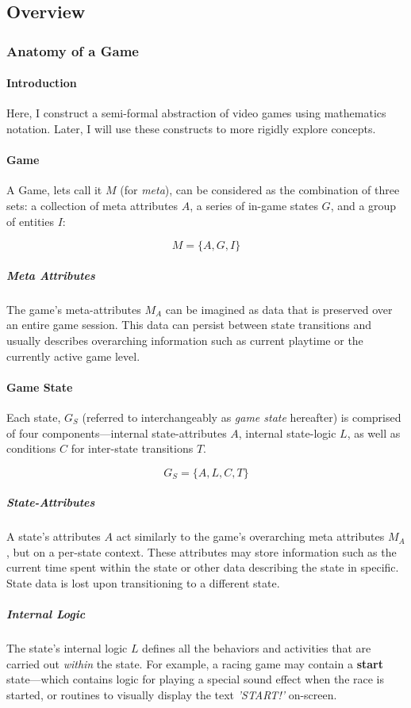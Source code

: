 \documentclass{report}
\begin{document}
\subsection{Overview}
\subsubsection{Anatomy of a Game}
\paragraph{Introduction}
Here, I construct a semi-formal abstraction of video games using mathematics notation. Later, I will use these constructs to more rigidly explore concepts.


\paragraph{Game}
A Game, lets call it $M$ (for \emph{meta}), can be considered as the combination of three sets: a collection of meta attributes $A$, a series of in-game states $G$, and a group of entities $I$:

$$
M = \{A, G, I\}
$$

\subparagraph{Meta Attributes}
The game's meta-attributes $M_A$ can be imagined as data that is preserved over an entire game session. This data can persist between state transitions and usually describes overarching information such as current playtime or the currently active game level. 

\paragraph{Game State}
Each state, $G_S$ (referred to interchangeably as \textit{game state} hereafter) is comprised of four components---internal state-attributes $A$, internal state-logic $L$, as well as conditions $C$ for inter-state transitions $T$.

$$
G_S = \{ A, L, C, T \}
$$

\subparagraph{State-Attributes}
A state's attributes $A$ act similarly to the game's overarching meta attributes $M_A$, but on a per-state context. These attributes may store information such as the current time spent within the state or other data describing the state in specific. State data is lost upon transitioning to a different state.

\subparagraph{Internal Logic}
The state's internal logic $L$ defines all the behaviors and activities that are carried out \textit{within} the state. For example, a racing game may contain a \textbf{start} state---which contains logic for playing a special sound effect when the race is started, or routines to visually display the text \textit{'START!'} on-screen. 
\end{document}
